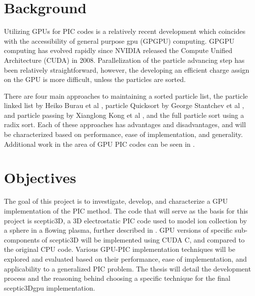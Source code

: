 \documentclass[12pt]{article} %
\begin{document}
\section{Background}
Utilizing GPUs for PIC codes is a relatively recent development which coincides with the accessibility of general purpose gpu (GPGPU) computing. GPGPU computing has evolved rapidly since NVIDIA released the Compute Unified Architecture (CUDA) in 2008. Parallelization of the particle advancing step has been relatively straightforward, however, the developing an efficient charge assign on the GPU is more difficult, unless the particles are sorted. 

There are four main approaches to maintaining a sorted particle list, the particle linked list by Heiko Burau et al \cite{Burau2010}, particle Quicksort by George Stantchev et al \cite{Stantchev2008}, and particle passing by Xianglong Kong et al \cite{Kong2011}, and the full particle sort using a radix sort. Each of these approaches has advantages and disadvantages, and will be characterized based on performance, ease of implementation, and generality. Additional work in the area of GPU PIC codes can be seen in \cite{Aubert2009,Abreu2011,Decyk2011,Joseph2011}.


\section{Objectives}
The goal of this project is to investigate, develop, and characterize a GPU implementation of the PIC method. The code that will serve as the basis for this project is sceptic3D, a 3D electrostatic PIC code used to model ion collection by a sphere in a flowing plasma, further described in \cite{Hutchinson2002,Hutchinson2003,Hutchinson2005,Hutchinson2006,Patacchini2007,Patacchini2010}. GPU versions of specific sub-components of sceptic3D will be implemented using CUDA C, and compared to the original CPU code. Various GPU-PIC implementation techniques will be explored and evaluated based on their performance, ease of implementation, and applicability to a generalized PIC problem. The thesis will detail the development process and the reasoning behind choosing a specific technique for the final sceptic3Dgpu implementation.



\end{document}
